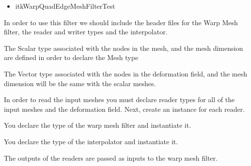 \documentclass{InsightArticle}
\begin{document}
\begin{itemize}
\item itkWarpQuadEdgeMeshFilterTest
\end{itemize}

In order to use this filter we should include the header files for the Warp Mesh filter, 
the reader and writer types and the interpolator.

\begin{center}

\end{center}

The Scalar type associated with the nodes in the mesh, and the mesh dimension
are defined in order to declare the Mesh type

\begin{center}

\end{center}

The Vector type associated with the nodes in the deformation field, and the mesh dimension
will be the same with the scalar meshes.

\begin{center}

\end{center}

In order to read the input meshes you must declare reader types for all of the input meshes
and the deformation field. Next, create an instance for each reader.

\begin{center}

\end{center}

You declare the type of the warp mesh filter and instantiate it.

\begin{center}

\end{center}

You declare the type of the interpolator and instantiate it.

\begin{center}

\end{center}

The outputs of the readers are passed as inputs to the warp mesh filter.
\end{document}
